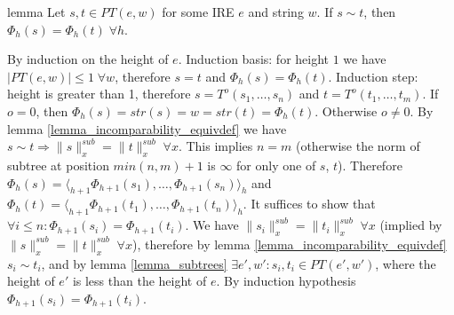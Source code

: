 \documentclass[AMA,STIX1COL]{WileyNJD-v2}
\newcommand{\Xl}{\langle}
\newcommand{\Xr}{\rangle}
\newcommand{\PT}{PT}
\newcommand{\snorm}[2]{\|{#1}\|^{sub}_{#2}}
\begin{document}
\begin{theoremEnd}{lemma}
    \label{lemma_pe_equiv}
    Let $s, t \in \PT(e, w)$ for some IRE $e$ and string $w$.
    If $s \sim t$, then $\Phi_{h}(s) = \Phi_{h}(t) \; \forall h$.
\end{theoremEnd}
\begin{proofEnd}
    By induction on the height of $e$.
    Induction basis: for height $1$ we have
    $| \PT(e, w) | \leq 1 \; \forall w$,
    therefore $s = t$ and $\Phi_{h}(s) = \Phi_{h}(t)$.
    Induction step:
    height is greater than 1, therefore
    $s = T^{o} (s_1, \dots, s_n)$ and
    $t = T^{o} (t_1, \dots, t_m)$.
    If $o = 0$, then $\Phi_{h}(s) = str(s) = w = str(t) = \Phi_{h}(t)$.
    Otherwise $o \neq 0$.
    By lemma \ref{lemma_incomparability_equivdef} we have $s \sim t \Rightarrow \snorm{s}{x} = \snorm{t}{x} \;\forall x$.
    This implies $n = m$ (otherwise the norm of subtree at position $min(n,m)+1$ is $\infty$ for only one of $s$, $t$).
    Therefore
    $\Phi_{h}(s) = \Xl_{h+1} \Phi_{h+1}(s_1), \dots, \Phi_{h+1}(s_n) \Xr_h$ and
    $\Phi_{h}(t) = \Xl_{h+1} \Phi_{h+1}(t_1), \dots, \Phi_{h+1}(t_n) \Xr_h$.
    It suffices to show that $\forall i \leq n: \Phi_{h+1}(s_i) = \Phi_{h+1}(t_i)$.
    We have $\snorm{s_i}{x} = \snorm{t_i}{x} \;\forall x$ (implied by $\snorm{s}{x} = \snorm{t}{x} \;\forall x$),
    therefore by lemma \ref{lemma_incomparability_equivdef} $s_i \sim t_i$,
    and by lemma \ref{lemma_subtrees} $\exists e', w': s_i, t_i \in \PT(e', w')$,
    where the height of $e'$ is less than the height of $e$.
    By induction hypothesis $\Phi_{h+1}(s_i) = \Phi_{h+1}(t_i)$.
\end{proofEnd}
\end{document}
